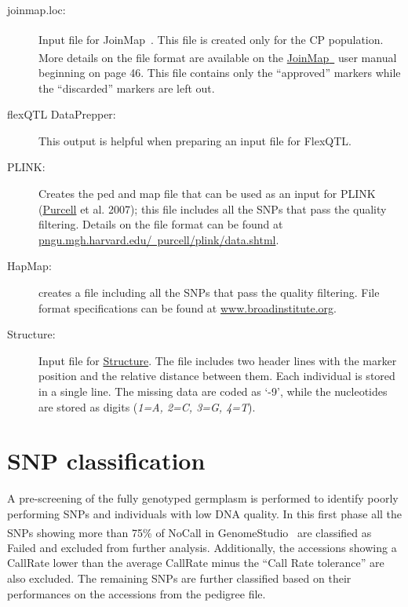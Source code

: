 \documentclass[a4paper,11pt,english]{article}
\newcommand{\reg}{\textsuperscript{\textregistered}}
\begin{document}
\begin{description}
\item [joinmap.loc:]  Input file for JoinMap\reg~. This file is created
only for the CP population. More details on the file format are available on the
\href{http://www.kyazma.nl/docs/JM4manual.pdf}{JoinMap\reg~} user manual beginning on 
page 46. This file contains only the ``approved'' markers while the ``discarded'' markers are
left out.

\item [flexQTL DataPrepper:] This output is helpful when preparing an input file for
FlexQTL\texttrademark.

\item [PLINK:] Creates the ped and map file that can be used as an input for PLINK
(\href{http://pngu.mgh.harvard.edu/~purcell/plink}{Purcell} et al. 2007);
this file includes all the SNPs that pass the quality filtering. Details on the file format can be
found at
\href{http://pngu.mgh.harvard.edu/~purcell/plink/data.shtml}{
pngu.mgh.harvard.edu/~purcell/plink/data.shtml}.

\item [HapMap:] creates a file including all the SNPs that pass the quality filtering.
File format specifications can be found at 
\href{
https://www.broadinstitute.org/science/programs/medical-and-population-genetics/haploview/input-file
-formats-0}{www.broadinstitute.org}.

\item [Structure:] Input file for
\href{http://pritchardlab.stanford.edu/structure.html}{Structure}. The file includes two header
lines with the marker
position and the relative distance between them. Each individual is stored in a single line. The
missing data are coded as `-9', while the nucleotides are stored as digits (\emph{1=A, 2=C, 3=G,
4=T}).
\end{description}


\section{SNP classification}
\label{index:snp-classification}\label{index:structure}
A pre-screening of the fully genotyped germplasm is performed  to identify poorly performing
SNPs and individuals with low DNA quality. In this first phase all the SNPs showing more than 75\%
of NoCall in GenomeStudio\reg~  are classified as Failed and excluded from further analysis.
Additionally,
the accessions showing a CallRate lower than the average CallRate minus the ``Call Rate tolerance''
are also excluded.
The remaining SNPs are further classified based on their performances on the accessions from
the pedigree file.
\end{document}
